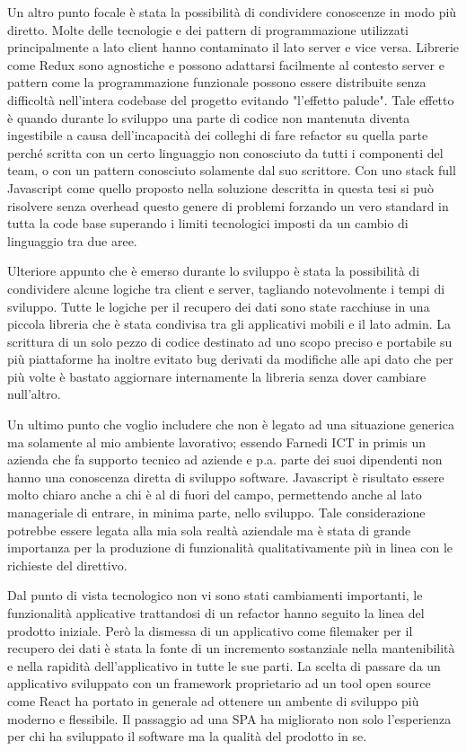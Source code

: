 Un altro punto focale è stata la possibilità di condividere conoscenze in modo più diretto. Molte delle tecnologie e dei pattern di programmazione utilizzati principalmente a lato client hanno contaminato il lato server e vice versa. Librerie come Redux sono agnostiche e possono adattarsi facilmente al contesto server e pattern come la programmazione funzionale possono essere distribuite senza difficoltà nell'intera codebase del progetto evitando "l'effetto palude". Tale effetto è quando durante lo sviluppo una parte di codice non mantenuta diventa ingestibile a causa dell'incapacità dei colleghi di fare refactor su quella parte perché scritta con un certo linguaggio non conosciuto da tutti i componenti del team, o con un pattern conosciuto solamente dal suo scrittore. Con uno stack full Javascript come quello proposto nella soluzione descritta in questa tesi si può risolvere senza overhead questo genere di problemi forzando un vero standard in tutta la code base superando i limiti tecnologici imposti da un cambio di linguaggio tra due aree.\vspace{5mm}

Ulteriore appunto che è emerso durante lo sviluppo è stata la possibilità di condividere alcune logiche tra client e server, tagliando notevolmente i tempi di sviluppo. Tutte le logiche per il recupero dei dati sono state racchiuse in una piccola libreria che è stata condivisa tra gli applicativi mobili e il lato admin. La scrittura di un solo pezzo di codice destinato ad uno scopo preciso e portabile su più piattaforme ha inoltre evitato bug derivati da modifiche alle api dato che per più volte è bastato aggiornare internamente la libreria senza dover cambiare null'altro.\vspace{5mm}

Un ultimo punto che voglio includere che non è legato ad una situazione generica ma solamente al mio ambiente lavorativo; essendo Farnedi ICT in primis un azienda che fa supporto tecnico ad aziende e p.a. parte dei suoi dipendenti non hanno una conoscenza diretta di sviluppo software. Javascript è risultato essere molto chiaro anche a chi è al di fuori del campo, permettendo anche al lato manageriale di entrare, in minima parte, nello sviluppo. Tale considerazione potrebbe essere legata alla mia sola realtà aziendale ma è stata di grande importanza per la produzione di funzionalità qualitativamente più in linea con le richieste del direttivo.\vspace{5mm}

Dal punto di vista tecnologico non vi sono stati cambiamenti importanti, le funzionalità applicative trattandosi di un refactor hanno seguito la linea del prodotto iniziale. Però la dismessa di un applicativo come filemaker per il recupero dei dati è stata la fonte di un incremento sostanziale nella mantenibilità e nella rapidità dell'applicativo in tutte le sue parti. La scelta di passare da un applicativo sviluppato con un framework proprietario ad un tool open source come React ha portato in generale ad ottenere un ambente di sviluppo più moderno e flessibile. Il passaggio ad una SPA\cite{SPA} ha migliorato non solo l'esperienza per chi ha sviluppato il software ma la qualità del prodotto in se.\vspace{5mm}

